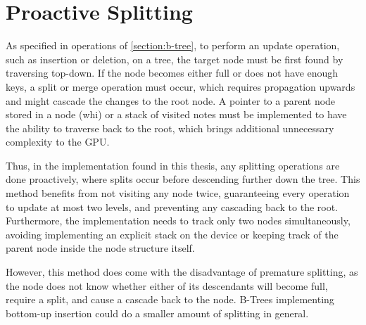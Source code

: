 \section{Proactive Splitting}

As specified in operations of \cref{section:b-tree}, to perform an update operation, such as insertion or deletion, on a tree, the target node must be first found by traversing top-down. If the node becomes either full or does not have enough keys, a split or merge operation must occur, which requires propagation upwards and might cascade the changes to the root node. A pointer to a parent node stored in a node (whi) or a stack of visited notes must be implemented to have the ability to traverse back to the root, which brings additional unnecessary complexity to the GPU.

Thus, in the implementation found in this thesis, any splitting operations are done proactively, where splits occur before descending further down the tree. This method benefits from not visiting any node twice, guaranteeing every operation to update at most two levels, and preventing any cascading back to the root. Furthermore, the implementation needs to track only two nodes simultaneously, avoiding implementing an explicit stack on the device or keeping track of the parent node inside the node structure itself.

However, this method does come with the disadvantage of premature splitting, as the node does not know whether either of its descendants will become full, require a split, and cause a cascade back to the node. B-Trees implementing bottom-up insertion could do a smaller amount of splitting in general.
